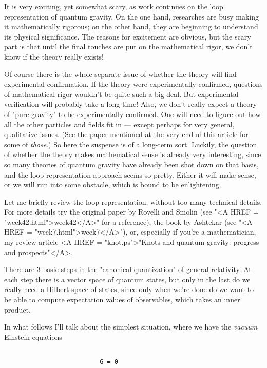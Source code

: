 

It is very exciting, yet somewhat scary, as work continues on the loop
representation of quantum gravity.  On the one hand, researches are busy
making it mathematically rigorous; on the other hand, they are beginning
to understand its physical significance.  The reasons for excitement are
obvious, but the scary part is that until the final touches are put on
the mathematical rigor, we don't know if the theory really exists!

Of course there is the whole separate issue of whether the theory will
find experimental confirmation.  If the theory were experimentally
confirmed, questions of mathematical rigor wouldn't be quite such a big
deal.  But experimental verification will probably take a long time!
Also, we don't really expect a theory of "pure gravity" to be
experimentally confirmed.  One will need to figure out how all the other
particles and fields fit in --- except perhaps for very general,
qualitative issues.  (See the paper mentioned at the very end of this
article for some of \emph{those}.)  So here the suspense is of a long-term
sort.  Luckily, the question of whether the theory makes mathematical
sense is already very interesting, since so many theories of quantum
gravity have already been shot down on that basis, and the loop
representation approach seems so pretty.  Either it will make sense, or
we will run into some obstacle, which is bound to be enlightening.

Let me briefly review the loop representation, without too many
technical details.  For more details try the original paper by Rovelli
and Smolin (see "<A HREF = "week42.html">week42</A>" for a reference), the book by Ashtekar (see
"<A HREF = "week7.html">week7</A>"), or, especially if you're a mathematician, 
my review article <A HREF = "knot.ps">"Knots and quantum gravity: progress and prospects"</A>.

There are 3 basic steps in the "canonical quantization" of general
relativity.  At each step there is a vector space of quantum states, but
only in the last do we really need a Hilbert space of states, since only
when we're done do we want to be able to compute expectation values of
observables, which takes an inner product.  

In what follows I'll talk about the simplest situation, where we have
the \emph{vacuum} Einstein equations 


\begin{verbatim}

                          G = 0
\end{verbatim}
    

